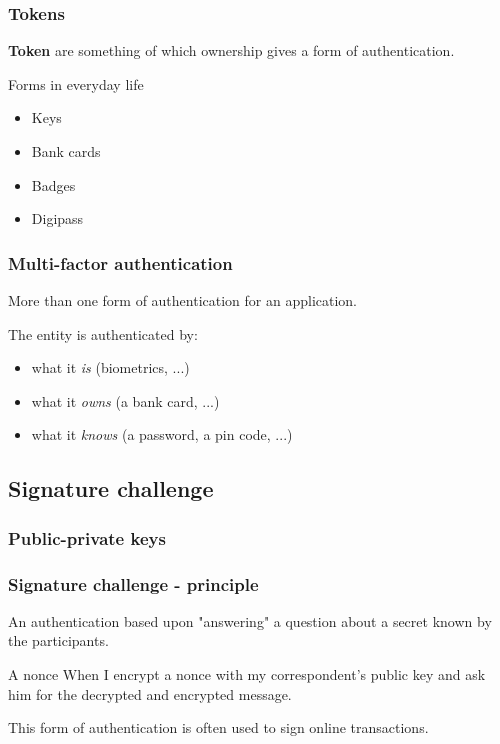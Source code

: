 \begin{frame}
\frametitle{Tokens}
\textbf{Token} are something of which ownership gives a form of
authentication.
\begin{exampleblock}{Forms in everyday life}
\begin{itemize}
\item Keys
\item Bank cards
\item Badges
\item Digipass
\end{itemize}
\end{exampleblock}
\end{frame}

\begin{frame}
\frametitle{Multi-factor authentication}
\begin{center}
More than one form of authentication for an application.
\end{center}
The entity is authenticated by:
\begin{itemize}
\item what it \emph{is} (biometrics, ...)
\item what it \emph{owns} (a bank card, ...)
\item what it \emph{knows} (a password, a pin code, ...)
\end{itemize}
\end{frame}

\subsection{Signature challenge}

\begin{frame}
\frametitle{Public-private keys}
\end{frame}

\begin{frame}
\frametitle{Signature challenge - principle}
An authentication based upon "answering" a question about a secret
known by the participants.
\begin{exampleblock}{A nonce}
When I encrypt a nonce with my correspondent's public key and ask him for the
decrypted and encrypted message.
\end{exampleblock}
This form of authentication is often used to sign online transactions.
\note{
	\begin{description}
	\item[Nonce]
	\end{description}
}
\end{frame}

